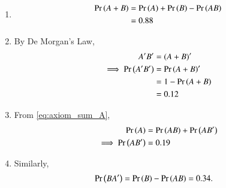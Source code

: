 \begin{enumerate}
\item  
\begin{align}
	\Pr\left(A+B\right) &=  \Pr\left(A\right) + \Pr\left(B\right) - \Pr\left(AB\right) \\&=  0.88
\end{align}
\item By De Morgan's Law,
\begin{align}
	A^\prime B^\prime &= {(A+B)}^\prime\\
	\implies \Pr\left(A^\prime B^\prime\right) &= \Pr\left(A+B\right)^\prime \\&= 1 - \Pr\left(A +B\right)\\
	&= 0.12
\end{align}
\item 
	From 
\eqref{eq:axiom_sum_A},
\begin{align}
\Pr\left(A \right) 
	 &= \Pr\left(AB\right)+\Pr\left(AB^\prime\right) \\
	 \implies \Pr\left(AB^\prime\right) 
	&= 0.19
\end{align}
\item Similarly, 
\begin{align}
	\Pr\left(B A^\prime\right) &= \Pr\left(B\right) - \Pr\left(AB\right) 
= 0.34.
\end{align}
\end{enumerate}



